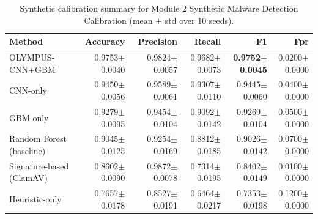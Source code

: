 \begin{table}[h]
\centering
\caption{Synthetic calibration summary for Module 2 Synthetic Malware Detection Calibration (mean $\pm$ std over 10 seeds).}
\label{tab:module2_malware_detection}
\begin{tabular}{lrrrrr}
\toprule
Method & Accuracy & Precision & Recall & F1 & Fpr \\
\midrule
OLYMPUS-CNN+GBM & 0.9753$\pm$0.0040 & 0.9824$\pm$0.0057 & 0.9682$\pm$0.0073 & \textbf{0.9752$\pm$0.0045} & 0.0200$\pm$0.0000 \\
CNN-only & 0.9450$\pm$0.0056 & 0.9589$\pm$0.0061 & 0.9307$\pm$0.0110 & 0.9445$\pm$0.0060 & 0.0400$\pm$0.0000 \\
GBM-only & 0.9279$\pm$0.0095 & 0.9454$\pm$0.0104 & 0.9092$\pm$0.0142 & 0.9269$\pm$0.0104 & 0.0500$\pm$0.0000 \\
Random Forest (baseline) & 0.9045$\pm$0.0125 & 0.9254$\pm$0.0169 & 0.8812$\pm$0.0185 & 0.9026$\pm$0.0142 & 0.0700$\pm$0.0000 \\
Signature-based (ClamAV) & 0.8602$\pm$0.0090 & 0.9872$\pm$0.0078 & 0.7314$\pm$0.0195 & 0.8402$\pm$0.0149 & 0.0100$\pm$0.0000 \\
Heuristic-only & 0.7657$\pm$0.0178 & 0.8527$\pm$0.0191 & 0.6464$\pm$0.0217 & 0.7353$\pm$0.0198 & 0.1200$\pm$0.0000 \\
\bottomrule
\end{tabular}
\end{table}